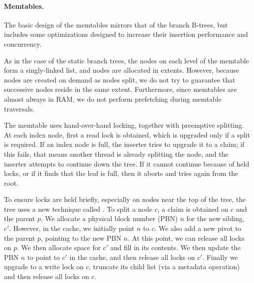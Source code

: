 \paragraph{Memtables.}
The basic design of the memtables mirrors that of the branch B-trees, but
includes some optimizations designed to increase their insertion performance
and concurrency.

As in the case of the static branch trees, the nodes on each level of the
memtable form a singly-linked list, and nodes are allocated in extents.
However, because nodes are created on
demand as nodes split, we do not try to guarantee that successive nodes
reside in the same extent.  Furthermore, since memtables are almost always
in RAM, we do not perform prefetching during memtable traversals.


The memtable uses hand-over-hand locking, together with preemptive
splitting. At each index node, first a read lock is obtained, which is
upgraded only if a split is required. If an index node is full, the
inserter tries to upgrade it to a claim; if this fails, that means
another thread is already splitting the node, and the inserter
attempts to continue down the tree.  If it cannot continue because of
held locks, or if it finds that the leaf is full, then it aborts and
tries again from the root.

To ensure locks are held briefly, especially on nodes near the top of
the tree, the tree uses a new technique called . To split a node $c$, a claim is obtained on $c$ and the
parent $p$. We allocate a physical block number (PBN) $n$ for the new
sibling, $c'$.  However, in the cache, we initially point $n$ to $c$.
We also add a new pivot to the parent $p$, pointing to the new PBN
$n$.  At this point, we can release all locks on $p$.  We then
allocate space for $c'$ and fill in its contents.  We then update the
PBN $n$ to point to $c'$ in the cache, and then release all locks on
$c'$.  Finally we upgrade to a write lock on $c$, truncate its child
list (via a metadata operation) and then release all locks on $c$.

